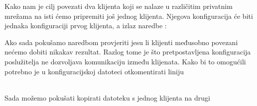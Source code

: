         Kako nam je cilj povezati dva klijenta koji se nalaze u različitim
        privatnim mrežama na isti ćemo pripremiti još jednog klijenta. Njegova
        konfiguracija će biti jednaka konfiguraciji prvog klijenta, a izlaz
        naredbe :

        \noindent
        Ako sada pokušamo naredbom
        provjeriti jesu li klijenti međusobno povezani nećemo dobiti nikakav
        rezultat. Razlog tome je što pretpostavljena konfiguracija poslužitelja
        ne dozvoljava komunikaciju između klijenata. Kako bi to omogućili
        potrebno je u konfiguracijskoj datoteci otkomentirati liniju 

        \noindent 
         \\

        Sada možemo pokušati kopirati datoteku s jednog klijenta na drugi 
